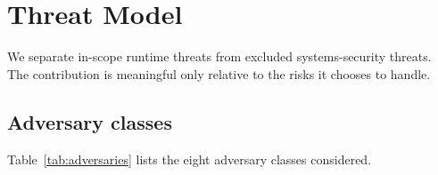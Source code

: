 \documentclass[pdflatex,sn-mathphys-num]{sn-jnl}
\begin{document}
\section{Threat Model}\label{sec:threat}

We separate in-scope runtime threats from excluded systems-security threats.
The contribution is meaningful only relative to the risks it chooses to
handle.

\subsection{Adversary classes}\label{sec:adversaries}

Table~\ref{tab:adversaries} lists the eight adversary classes considered.
\end{document}
